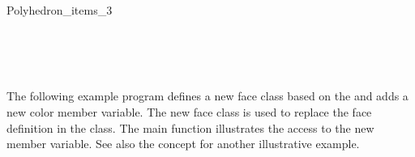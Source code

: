 \begin{ccRefClass}{Polyhedron_items_3}
\ccSeeAlso

\\
\\
\\

\ccExample

The following example program defines a new face class based on the
 and adds a new color member variable.
The new face class is used to replace the face definition in the
 class. The main function illustrates the
access to the new member variable.
See also the  concept for another illustrative
example.


\end{ccRefClass}

\ccRefPageEnd

